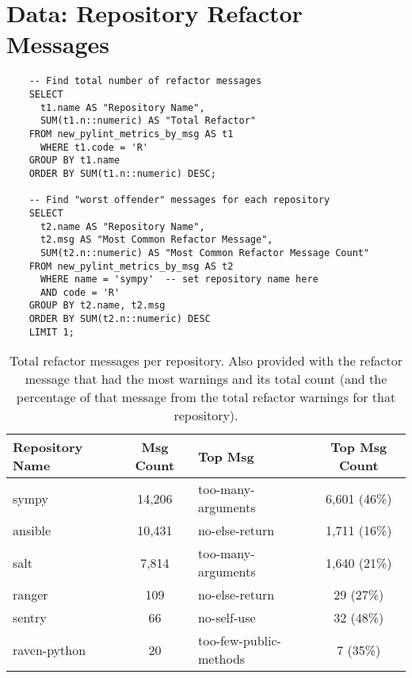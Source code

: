 \section{Data: Repository Refactor Messages} \label{appendixRefactorCounts}

\begin{singlespace}
  \begin{verbatim}
    -- Find total number of refactor messages
    SELECT 
      t1.name AS "Repository Name",
      SUM(t1.n::numeric) AS "Total Refactor"
    FROM new_pylint_metrics_by_msg AS t1
      WHERE t1.code = 'R'
    GROUP BY t1.name
    ORDER BY SUM(t1.n::numeric) DESC;

    -- Find "worst offender" messages for each repository
    SELECT
      t2.name AS "Repository Name",
      t2.msg AS "Most Common Refactor Message",
      SUM(t2.n::numeric) AS "Most Common Refactor Message Count"
    FROM new_pylint_metrics_by_msg AS t2
      WHERE name = 'sympy'  -- set repository name here
      AND code = 'R'
    GROUP BY t2.name, t2.msg
    ORDER BY SUM(t2.n::numeric) DESC
    LIMIT 1;
  \end{verbatim}
\end{singlespace}

\begin{table}[ht]
  \small
  \centering
  \begin{tabularx}{1.0\textwidth} {
    | l 
    | c
    | >{\centering\arraybackslash}X 
    | c |
  }
    \hline
    Repository Name & Msg Count & Top Msg & Top Msg Count \\
    \hline\hline
    sympy & 14,206 & too-many-arguments & 6,601 (46\%) \\ \hline
    ansible &  10,431 & no-else-return & 1,711 (16\%) \\ \hline
    salt &  7,814 & too-many-arguments & 1,640 (21\%) \\ \hline
    ranger & 109 & no-else-return & 29 (27\%) \\ \hline
    sentry & 66 & no-self-use & 32 (48\%) \\ \hline
    raven-python & 20 & too-few-public-methods & 7 (35\%) \\ \hline
  \end{tabularx}
  \caption{Total refactor messages per repository. Also provided with the refactor message that had the most warnings and its total count (and the percentage of that message from the total refactor warnings for that repository).}
  \label{table:allRefactorWarningTotals}
\end{table}
